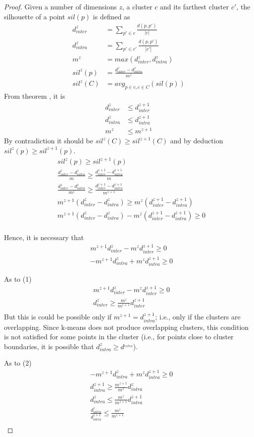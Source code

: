 \begin{proof}
Given a number of dimensions $z$, a cluster $c$ and its farthest cluster $c'$, the silhouette of a point $sil(p)$ is defined as
\begin{align*}
d^z_{inter} &= \sum_{p' \in c} \frac{d(p, p')}{|c|}\\
d^z_{intra} &= \sum_{p' \in c'} \frac{d(p, p')}{|c'|}\\
m^z &= max(d^z_{inter}, d^z_{intra})\\
sil^z(p) &= \frac{d^z_{inter} - d^z_{intra}}{m^z}\\
sil^z(C) &=avg_{p \in c, c \in C }(sil(p))
\end{align*}
From theorem , it is 
\begin{align*}
d^z_{inter} &\leq d^{z+1}_{inter}\\
d^z_{intra} &\leq d^{z+1}_{intra}\\
m^z &\leq m^{z+1}
\end{align*}
By contradiction it should be $sil^z(C) \ge sil^{z+1}(C)$ and by deduction $sil^z(p) \ge sil^{z+1}(p)$.
\begin{align*}
&sil^z(p) \ge sil^{z+1}(p)\\
&\frac{d^z_{inter} - d^z_{intra}}{m} \ge \frac{d^{z+1}_{inter} - d^{z+1}_{intra}}{m}\\
&\frac{d^z_{inter} - d^z_{intra}}{m^z} \ge \frac{d^{z+1}_{inter} - d^{z+1}_{intra}}{m^{z+1}}\\
&m^{z+1}(d^z_{inter} - d^z_{intra}) \ge m^z(d^{z+1}_{inter} - d^{z+1}_{intra})\\
&m^{z+1}(d^z_{inter} - d^z_{intra}) - m^z(d^{z+1}_{inter} - d^{z+1}_{intra}) \ge 0\\
\end{align*}

Hence, it is necessary that
\begin{align}
&m^{z+1}d^z_{inter} - m^z d^{z+1}_{inter} \ge 0\\
&-m^{z+1} d^z_{intra} + m^z d^{z+1}_{intra} \ge 0
\end{align}

As to (1)
\begin{align*}
&m^{z+1}d^z_{inter} - m^z d^{z+1}_{inter} \ge 0\\
&d^z_{inter} \ge \frac{m^z}{m^{z+1}} d^{z+1}_{inter}\\
\end{align*}
But this is could be possible only if $m^{z+1} = d^{z+1}_{intra}$; i.e., only if the clusters are overlapping. Since k-means does not produce overlapping clusters, this condition is not satisfied for some points in the cluster (i.e., for points close to cluster boundaries, it is possible that $d^z_{intra} \ge d^_{extra}$).

As to (2)
\begin{align*}
&-m^{z+1} d^z_{intra} + m^z d^{z+1}_{intra} \ge 0\\
&d^{z+1}_{intra} \ge \frac{m^{z+1}}{m^z} d^z_{intra}\\
&d^{z}_{intra} \le \frac{m^z}{m^{z+1}} d^{z + 1}_{intra}\\
&\frac{d^{z}_{intra}}{d^{z + 1}_{intra}} \le \frac{m^z}{m^{z+1}}\\
\end{align*}
\eop
\end{proof}
